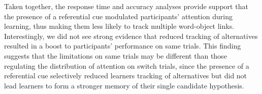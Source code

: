 \documentclass[10pt,letterpaper]{article}
\begin{document}

Taken together, the response time and accuracy analyses provide support that the presence of a referential cue modulated participants' attention during learning, thus making them less likely to track multiple word-object links. Interestingly, we did not see strong evidence that reduced tracking of alternatives resulted in a boost to participants' performance on same trials. This finding suggests that the limitations on same trials may be different than those regulating the distribution of attention on switch trials, since the presence of a referential cue selectively reduced learners tracking of alternatives but did not lead learners to form a stronger memory of their single candidate hypothesis. 
\end{document}
